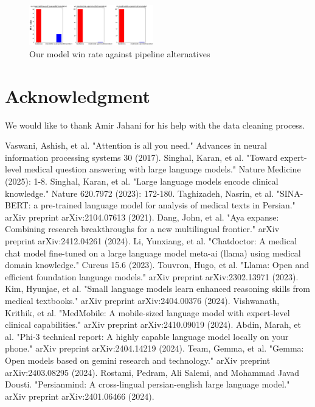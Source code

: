 \documentclass[conference]{IEEEtran}
\begin{document}
\begin{figure}[htbp]
	\centerline{\includegraphics[width=0.48\textwidth]{fig5.png}}
	\caption{Our model win rate against pipeline alternatives}
	\label{fig5}
\end{figure}
\section*{Acknowledgment}
We would like to thank Amir Jahani for his help with the data cleaning process.


\begin{thebibliography}{00}
 Vaswani, Ashish, et al. "Attention is all you need." Advances in neural information processing systems 30 (2017).
 Singhal, Karan, et al. "Toward expert-level medical question answering with large language models." Nature Medicine (2025): 1-8.
Singhal, Karan, et al. "Large language models encode clinical knowledge." Nature 620.7972 (2023): 172-180.
 Taghizadeh, Nasrin, et al. "SINA-BERT: a pre-trained language model for analysis of medical texts in Persian." arXiv preprint arXiv:2104.07613 (2021).
 Dang, John, et al. "Aya expanse: Combining research breakthroughs for a new multilingual frontier." arXiv preprint arXiv:2412.04261 (2024).
 Li, Yunxiang, et al. "Chatdoctor: A medical chat model fine-tuned on a large language model meta-ai (llama) using medical domain knowledge." Cureus 15.6 (2023).
 Touvron, Hugo, et al. "Llama: Open and efficient foundation language models." arXiv preprint arXiv:2302.13971 (2023).
 Kim, Hyunjae, et al. "Small language models learn enhanced reasoning skills from medical textbooks." arXiv preprint arXiv:2404.00376 (2024).
 Vishwanath, Krithik, et al. "MedMobile: A mobile-sized language model with expert-level clinical capabilities." arXiv preprint arXiv:2410.09019 (2024).
 Abdin, Marah, et al. "Phi-3 technical report: A highly capable language model locally on your phone." arXiv preprint arXiv:2404.14219 (2024).
 Team, Gemma, et al. "Gemma: Open models based on gemini research and technology." arXiv preprint arXiv:2403.08295 (2024).
 Rostami, Pedram, Ali Salemi, and Mohammad Javad Dousti. "Persianmind: A cross-lingual persian-english large language model." arXiv preprint arXiv:2401.06466 (2024).

\end{thebibliography}
\end{document}
